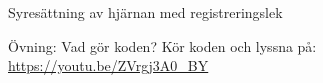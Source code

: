 \begin{Slide}{Syresättning av hjärnan med registreringslek}\SlideFontTiny

\vspace{-0.65em}
Övning: Vad gör koden?
%
\vspace{-0.5em}Kör koden och lyssna på: \href{https://youtu.be/ZVrgj3A0_BY}{https://youtu.be/ZVrgj3A0\_BY}
\end{Slide}
